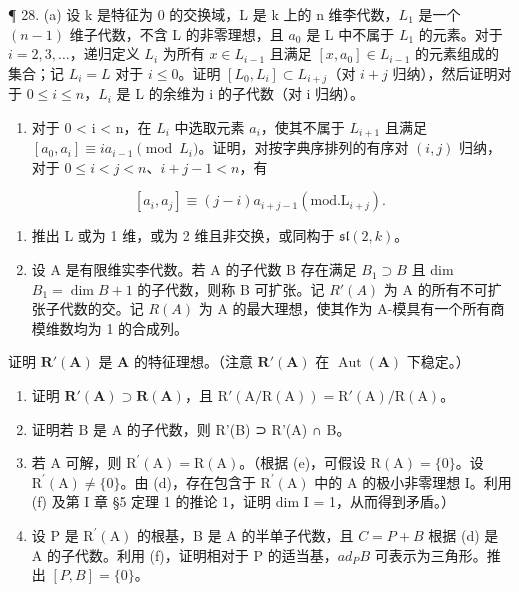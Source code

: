¶ 28. (a) 设 k 是特征为 0 的交换域，L 是 k 上的 n 维李代数，\(L_{1}\) 是一个 \((n-1)\) 维子代数，不含 L 的非零理想，且 \(a_{0}\) 是 L 中不属于 \(L_{1}\) 的元素。对于 \(i=2,3,\ldots\)，递归定义 \(L_{i}\) 为所有 \(x\in L_{i-1}\) 且满足 \([x,a_{0}]\in L_{i-1}\) 的元素组成的集合；记 \(L_{i}=L\) 对于 \(i\leqslant0\)。证明 \([L_{0},L_{i}]\subset L_{i+j}\)（对 \(i+j\) 归纳），然后证明对于 \(0\leqslant i\leqslant n\)，\(L_{i}\) 是 L 的余维为 i 的子代数（对 i 归纳）。

\begin{enumerate}
\def\labelenumi{(\alph{enumi})}
\setcounter{enumi}{1}
\tightlist
\item
  对于 0 \textless{} i \textless{} n，在 \(L_{i}\) 中选取元素 \(a_{i}\)，使其不属于 \(L_{i+1}\) 且满足 \([a_{0}, a_{i}] \equiv ia_{i-1} \pmod{L_{i}}\)。证明，对按字典序排列的有序对 \((i, j)\) 归纳，对于 \(0 \leqslant i < j < n\)、\(i + j - 1 < n\)，有
\end{enumerate}

\[
[ a _ {i}, a _ {j} ] \equiv (j - i) a _ {i + j - 1} (\mathrm{mod}. \mathrm{L} _ {i + j}).
\]

\begin{enumerate}
\def\labelenumi{(\alph{enumi})}
\setcounter{enumi}{2}
\item
  推出 L 或为 1 维，或为 2 维且非交换，或同构于 \(\mathfrak{sl}(2,k)\)。
\item
  设 A 是有限维实李代数。若 A 的子代数 B 存在满足 \(B_{1} \supset B\) 且 dim \(B_{1} = \dim B + 1\) 的子代数，则称 B 可扩张。记 \(R'(A)\) 为 A 的所有不可扩张子代数的交。记 \(R(A)\) 为 A 的最大理想，使其作为 A-模具有一个所有商模维数均为 1 的合成列。
\end{enumerate}

证明 \(\mathbf{R}'(\mathbf{A})\) 是 \(\mathbf{A}\) 的特征理想。（注意 \(\mathbf{R}'(\mathbf{A})\) 在 \(\operatorname{Aut}(\mathbf{A})\) 下稳定。）

\begin{enumerate}
\def\labelenumi{(\alph{enumi})}
\setcounter{enumi}{4}
\item
  证明 \(\mathbf{R}'(\mathbf{A})\supset \mathbf{R}(\mathbf{A})\)，且 \(\mathrm{R}'(\mathrm{A} / \mathrm{R}(\mathrm{A})) = \mathrm{R}'(\mathrm{A}) / \mathrm{R}(\mathrm{A})\)。
\item
  证明若 B 是 A 的子代数，则 R'(B) ⊃ R'(A) ∩ B。
\item
  若 A 可解，则 \(\mathrm{R}^{\prime}(\mathrm{A}) = \mathrm{R}(\mathrm{A})\)。（根据 (e)，可假设 \(\mathrm{R}(\mathrm{A}) = \{0\}\)。设 \(\mathrm{R}^{\prime}(\mathrm{A}) \neq \{0\}\)。由 (d)，存在包含于 \(\mathrm{R}^{\prime}(\mathrm{A})\) 中的 A 的极小非零理想 I。利用 (f) 及第 I 章 §5 定理 1 的推论 1，证明 dim I = 1，从而得到矛盾。）
\item
  设 P 是 \(\mathrm{R}^{\prime}(\mathrm{A})\) 的根基，B 是 A 的半单子代数，且 \(C = P + B\) 根据 (d) 是 A 的子代数。利用 (f)，证明相对于 P 的适当基，\(ad_{P}B\) 可表示为三角形。推出 \([P, B] = \{0\}\)。
\end{enumerate}

